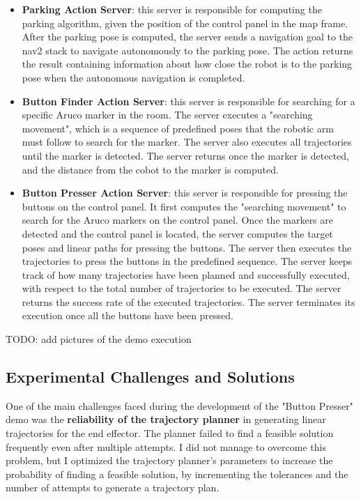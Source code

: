 \begin{itemize}
    \item \textbf{Parking Action Server}: this server is responsible for computing the parking algorithm, given the
    position of the control panel in the map frame. After the parking pose is computed, the server sends a navigation
    goal to the nav2 stack to navigate autonomously to the parking pose. The action returns the result containing
    information about how close the robot is to the parking pose when the autonomous navigation is completed.
    \item \textbf{Button Finder Action Server}: this server is responsible for searching for a specific Aruco marker
    in the room. The server executes a "searching movement", which is a sequence of predefined poses that the robotic arm
    must follow to search for the marker. The server also executes all trajectories until the marker is detected.
    The server returns once the marker is detected, and the distance from the cobot to the marker is computed.
    \item \textbf{Button Presser Action Server}: this server is responsible for pressing the buttons on the control panel.
    It first computes the "searching movement" to search for the Aruco markers on the control panel.
    Once the markers are detected and the control panel is located, the server computes the target poses and linear paths
    for pressing the buttons. The server then executes the trajectories to press the buttons in the predefined sequence.
    The server keeps track of how many trajectories have been planned and successfully executed, with respect to
    the total number of trajectories to be executed. The server returns the success rate of the executed trajectories.
    The server terminates its execution once all the buttons have been pressed.
\end{itemize}

TODO: add pictures of the demo execution

\subsection{Experimental Challenges and Solutions}

One of the main challenges faced during the development of the "Button Presser" demo was the \textbf{reliability of the
trajectory planner} in generating linear trajectories for the end effector. The planner failed to find a feasible
solution frequently even after multiple attempts. I did not manage to overcome this problem, but I optimized
the trajectory planner's parameters to increase the probability of finding a feasible solution, by incrementing
the tolerances and the number of attempts to generate a trajectory plan. 

